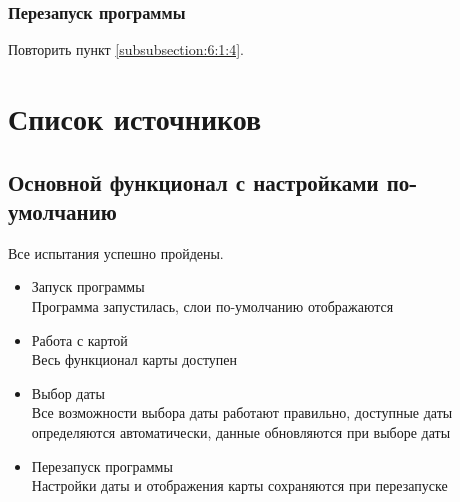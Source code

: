 \documentclass[a4paper, 12pt]{article}
\begin{document}
	\subsubsection{Перезапуск программы}
	Повторить пункт \ref{subsubsection:6:1:4}.

	\newpage

	\section{Список источников}
	\begingroup
	\renewcommand{\section}[2]{}
	
	
	\endgroup


	\subsection{Основной функционал с настройками по-умолчанию}
	Все испытания успешно пройдены.

	\begin{itemize}
		\item Запуск программы \\ Программа запустилась, слои по-умолчанию отображаются
		\item Работа с картой \\ Весь функционал карты доступен
		\item Выбор даты \\ Все возможности выбора даты работают правильно, доступные даты определяются автоматически, данные обновляются при выборе даты
		\item Перезапуск программы \\ Настройки даты и отображения карты сохраняются при перезапуске
	\end{itemize}
\end{document}
